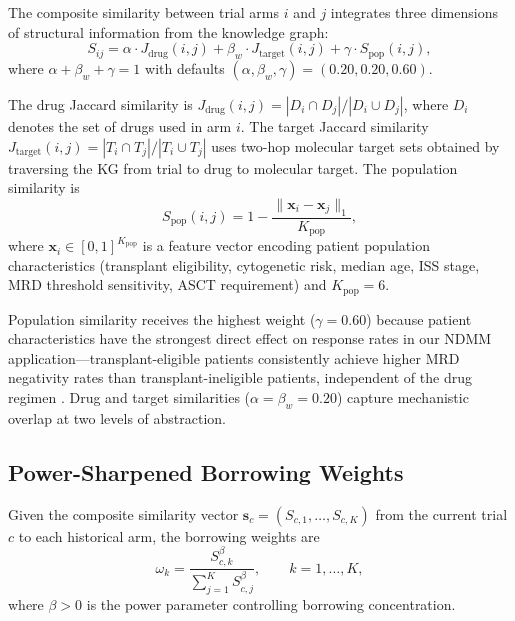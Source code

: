\documentclass[12pt]{article}
\newcommand{\Jdrug}{J_{\mathrm{drug}}}
\newcommand{\Jtarget}{J_{\mathrm{target}}}
\newcommand{\Spop}{S_{\mathrm{pop}}}
\begin{document}
The composite similarity between trial arms $i$ and $j$ integrates three dimensions of structural information from the knowledge graph:
\begin{equation}
S_{ij} = \alpha \cdot \Jdrug(i,j) + \beta_w \cdot \Jtarget(i,j) + \gamma \cdot \Spop(i,j),
\label{eq:composite_sim}
\end{equation}
where $\alpha + \beta_w + \gamma = 1$ with defaults $(\alpha, \beta_w, \gamma) = (0.20, 0.20, 0.60)$.

The drug Jaccard similarity is $\Jdrug(i,j) = |D_i \cap D_j| / |D_i \cup D_j|$, where $D_i$ denotes the set of drugs used in arm $i$. The target Jaccard similarity $\Jtarget(i,j) = |T_i \cap T_j| / |T_i \cup T_j|$ uses two-hop molecular target sets obtained by traversing the KG from trial to drug to molecular target. The population similarity is
\begin{equation}
\Spop(i,j) = 1 - \frac{\|\mathbf{x}_i - \mathbf{x}_j\|_1}{K_{\mathrm{pop}}},
\label{eq:pop_sim}
\end{equation}
where $\mathbf{x}_i \in [0,1]^{K_{\mathrm{pop}}}$ is a feature vector encoding patient population characteristics (transplant eligibility, cytogenetic risk, median age, ISS stage, MRD threshold sensitivity, ASCT requirement) and $K_{\mathrm{pop}} = 6$.

Population similarity receives the highest weight ($\gamma = 0.60$) because patient characteristics have the strongest direct effect on response rates in our NDMM application---transplant-eligible patients consistently achieve higher MRD negativity rates than transplant-ineligible patients, independent of the drug regimen \citep[see, e.g.,][]{viele2014use}. Drug and target similarities ($\alpha = \beta_w = 0.20$) capture mechanistic overlap at two levels of abstraction.

\subsection{Power-Sharpened Borrowing Weights}
\label{sec:power_weights}

Given the composite similarity vector $\mathbf{s}_c = (S_{c,1}, \ldots, S_{c,K})$ from the current trial $c$ to each historical arm, the borrowing weights are
\begin{equation}
\omega_k = \frac{S_{c,k}^\beta}{\sum_{j=1}^{K} S_{c,j}^\beta}, \qquad k = 1, \ldots, K,
\label{eq:power_weights}
\end{equation}
where $\beta > 0$ is the power parameter controlling borrowing concentration.
\end{document}
